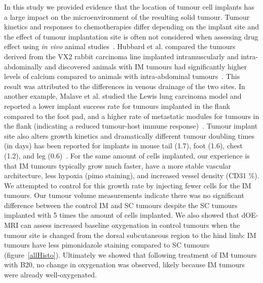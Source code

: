 In this study we provided evidence that the location of tumour cell implants has a large impact on the microenvironment of the resulting solid tumour.
Tumour kinetics and responses to chemotherapies differ depending on the implant site and the effect of tumour implantation site is often not considered when assessing drug effect using \emph{in vivo} animal studies~\cite{Arjona:2006ch}.
Hubbard et al. compared the tumours derived from the VX2 rabbit carcinoma line implanted intramuscularly and intra-abdominally and discovered animals with \acs{IM} tumours had significantly higher levels of calcium compared to animals with intra-abdominal tumours~\cite{Hubbard:1980vf}.
This result was attributed to the differences in venous drainage of the two sites.
In another example, Malave et al. studied the Lewis lung carcinoma model and reported a lower implant success rate for tumours implanted in the flank compared to the foot pad, and a higher rate of metastatic modules for tumours in the flank (indicating a reduced tumour-host immune response)~\cite{Malave:1979ui}.
Tumour implant site also alters growth kinetics and dramatically different tumour doubling times (in days) has been reported for implants in mouse tail (1.7), foot (1.6), chest (1.2), and leg (0.6)~\cite{Hill:1982ci}.
For the same amount of cells implanted, our experience is that \acs{IM} tumours typically grow much faster, have a more stable vascular architecture, less hypoxia (pimo staining), and increased vessel density (CD31 \%).
We attempted to control for this growth rate by injecting fewer cells for the \acs{IM} tumours. 
Our tumour volume measurements indicate there was no significant difference between the control \acs{IM} and \acs{SC} tumours despite the \acs{SC} tumours implanted with 5 times the amount of cells implanted.
We also showed that \acs{dOE-MRI} can assess increased baseline oxygenation in control tumours when the tumour site is changed from the dorsal subcutaneous region to the hind limb: \acs{IM} tumours have less pimonidazole staining compared to \acs{SC} tumours (figure~\ref{allHisto}).
Ultimately we showed that following treatment of \acs{IM} tumours with B20, no change in oxygenation was observed, likely because \acs{IM} tumours were already well-oxygenated.

